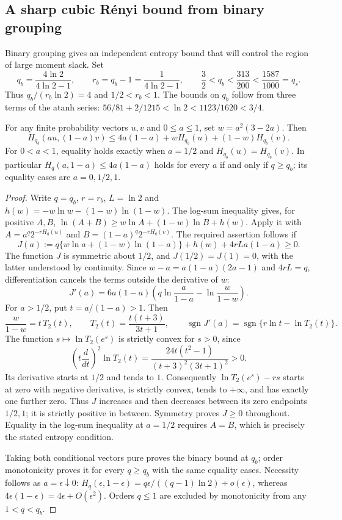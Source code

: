 \subsection{A sharp cubic R\'enyi bound from binary grouping}
\label{sec:fqe-renyi-cubic-bound}

Binary grouping gives an independent entropy bound that will control the region of large moment slack. Set
\[
q_b=\frac{4\ln2}{4\ln2-1},\qquad
r_b=q_b-1=\frac1{4\ln2-1},\qquad
\frac32<q_b<\frac{313}{200}<\frac{1587}{1000}=q_s.
\tag{BT}\label{eq:fqe-binary-threshold}
\]
Thus $q_b/(r_b\ln2)=4$ and $1/2<r_b<1$.
The bounds on $q_b$ follow from three terms of the atanh series:
$56/81+2/1215<\ln2<1123/1620<3/4$.

\begin{lemma}
\label{lem:fqe-renyi-grouping}
For any finite probability vectors $u,v$ and $0\le a\le1$, set
$w=a^2(3-2a)$. Then
\[
H_{q_b}(au,(1-a)v)
\le4a(1-a)+wH_{q_b}(u)+(1-w)H_{q_b}(v).
\tag{BG}\label{eq:fqe-renyi-grouping}
\]
For $0<a<1$, equality holds exactly when $a=1/2$ and
$H_{q_b}(u)=H_{q_b}(v)$.
In particular $H_q(a,1-a)\le4a(1-a)$ holds for every $a$ if and only if
$q\ge q_b$; its equality cases are $a=0,1/2,1$.
\end{lemma}
\begin{proof}
Write $q=q_b$, $r=r_b$, $L=\ln2$ and
$h(w)=-w\ln w-(1-w)\ln(1-w)$.
The log-sum inequality gives, for positive $A,B$,
$\ln(A+B)\ge w\ln A+(1-w)\ln B+h(w)$.
Apply it with $A=a^q2^{-rH_q(u)}$ and
$B=(1-a)^q2^{-rH_q(v)}$. The required assertion follows if
\[
J(a):=q\{w\ln a+(1-w)\ln(1-a)\}+h(w)+4rL a(1-a)\ge0.
\]
The function $J$ is symmetric about $1/2$, and
$J(1/2)=J(1)=0$, with the latter understood by continuity.
Since $w-a=a(1-a)(2a-1)$ and $4rL=q$, differentiation cancels the
terms outside the derivative of $w$:
\[
J'(a)=6a(1-a)\left(q\ln\frac a{1-a}-\ln\frac w{1-w}\right).
\]
For $a>1/2$, put $t=a/(1-a)>1$. Then
\[
\frac w{1-w}=t\,T_2(t),\qquad T_2(t)=\frac{t(t+3)}{3t+1},
\qquad \operatorname{sgn}J'(a)=\operatorname{sgn}\{r\ln t-\ln T_2(t)\}.
\]
The function $s\mapsto\ln T_2(e^s)$ is strictly convex for $s>0$, since
\[
\left(t\frac d{dt}\right)^2\ln T_2(t)
=\frac{24t(t^2-1)}{(t+3)^2(3t+1)^2}>0.
\]
Its derivative starts at $1/2$ and tends to $1$.
Consequently $\ln T_2(e^s)-rs$ starts at zero with negative derivative,
is strictly convex, tends to $+\infty$, and has exactly one further zero.
Thus $J$ increases and then decreases between its zero endpoints $1/2,1$;
it is strictly positive in between. Symmetry proves $J\ge0$ throughout.
Equality in the log-sum inequality at $a=1/2$ requires $A=B$,
which is precisely the stated entropy condition.

Taking both conditional vectors pure proves the binary bound at $q_b$;
order monotonicity proves it for every $q\ge q_b$ with the same equality
cases. Necessity follows as $a=\epsilon\downarrow0$:
$H_q(\epsilon,1-\epsilon)=q\epsilon/((q-1)\ln2)+o(\epsilon)$,
whereas $4\epsilon(1-\epsilon)=4\epsilon+O(\epsilon^2)$.
Orders $q\le1$ are excluded by monotonicity from any $1<q<q_b$.
\end{proof}

